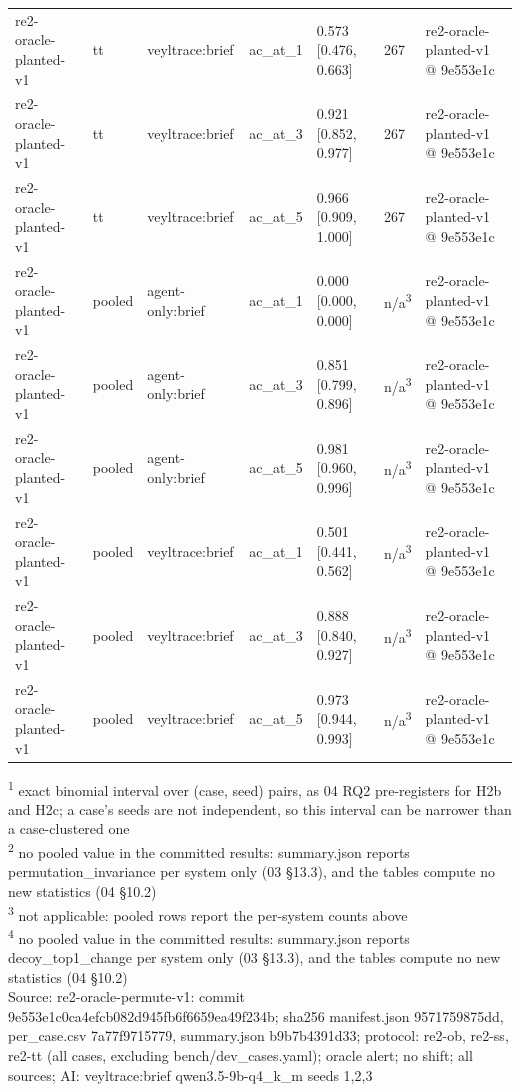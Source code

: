 \begin{table}[t]
\begin{tabular}{lllllll}
re2-oracle-planted-v1 & tt & veyltrace:brief & ac\_at\_1 & 0.573 [0.476, 0.663] & 267 & re2-oracle-planted-v1 @ 9e553e1c \\
re2-oracle-planted-v1 & tt & veyltrace:brief & ac\_at\_3 & 0.921 [0.852, 0.977] & 267 & re2-oracle-planted-v1 @ 9e553e1c \\
re2-oracle-planted-v1 & tt & veyltrace:brief & ac\_at\_5 & 0.966 [0.909, 1.000] & 267 & re2-oracle-planted-v1 @ 9e553e1c \\
re2-oracle-planted-v1 & pooled & agent-only:brief & ac\_at\_1 & 0.000 [0.000, 0.000] & n/a\textsuperscript{3} & re2-oracle-planted-v1 @ 9e553e1c \\
re2-oracle-planted-v1 & pooled & agent-only:brief & ac\_at\_3 & 0.851 [0.799, 0.896] & n/a\textsuperscript{3} & re2-oracle-planted-v1 @ 9e553e1c \\
re2-oracle-planted-v1 & pooled & agent-only:brief & ac\_at\_5 & 0.981 [0.960, 0.996] & n/a\textsuperscript{3} & re2-oracle-planted-v1 @ 9e553e1c \\
re2-oracle-planted-v1 & pooled & veyltrace:brief & ac\_at\_1 & 0.501 [0.441, 0.562] & n/a\textsuperscript{3} & re2-oracle-planted-v1 @ 9e553e1c \\
re2-oracle-planted-v1 & pooled & veyltrace:brief & ac\_at\_3 & 0.888 [0.840, 0.927] & n/a\textsuperscript{3} & re2-oracle-planted-v1 @ 9e553e1c \\
re2-oracle-planted-v1 & pooled & veyltrace:brief & ac\_at\_5 & 0.973 [0.944, 0.993] & n/a\textsuperscript{3} & re2-oracle-planted-v1 @ 9e553e1c \\
\hline
\end{tabular}
\par\smallskip\footnotesize
\textsuperscript{1} exact binomial interval over (case, seed) pairs, as 04 RQ2 pre-registers for H2b and H2c; a case's seeds are not independent, so this interval can be narrower than a case-clustered one\\
\textsuperscript{2} no pooled value in the committed results: summary.json reports permutation\_invariance per system only (03 \S{}13.3), and the tables compute no new statistics (04 \S{}10.2)\\
\textsuperscript{3} not applicable: pooled rows report the per-system counts above\\
\textsuperscript{4} no pooled value in the committed results: summary.json reports decoy\_top1\_change per system only (03 \S{}13.3), and the tables compute no new statistics (04 \S{}10.2)\\
Source: re2-oracle-permute-v1: commit 9e553e1c0ca4efcb082d945fb6f6659ea49f234b; sha256 manifest.json 9571759875dd, per\_case.csv 7a77f9715779, summary.json b9b7b4391d33; protocol: re2-ob, re2-ss, re2-tt (all cases, excluding bench/dev\_cases.yaml); oracle alert; no shift; all sources; AI: veyltrace:brief qwen3.5-9b-q4\_k\_m seeds 1,2,3\\

\end{table}

